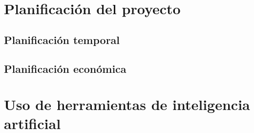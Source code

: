 \section{Planificación del proyecto}
\label{sec:planificacion}

\subsection{Planificación temporal}
\label{subsec:planificacion-temporal}



\subsection{Planificación económica}
\label{subsec:planificacion-economica}



\section{Uso de herramientas de inteligencia artificial}
\label{sec:uso-ia}


